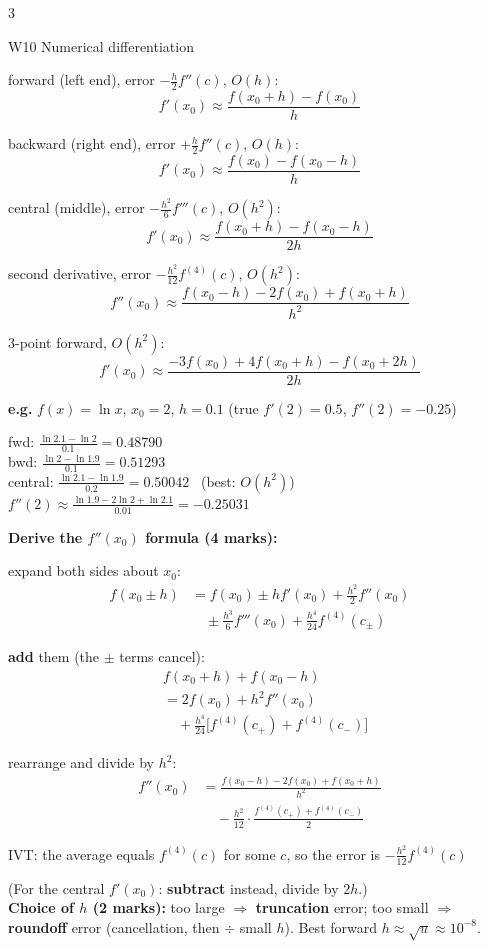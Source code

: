 \documentclass[8pt,a4paper]{extarticle}
\newcommand{\hd}[1]{\par\vspace{3pt}\noindent\colorbox{accent}{\parbox{\dimexpr\linewidth-2\fboxsep}{\color{white}\bfseries\strut #1}}\par\vspace{1pt}}
\newcommand{\sub}[1]{\textbf{\color{accent}#1}}
\newenvironment{ex}[1]{\par\vspace{2pt}\noindent\begin{lrbox}{\exbox}\begin{minipage}{\dimexpr\linewidth-2\fboxsep}\RaggedRight\color{grn}\textbf{e.g.} #1\par\setlength{\parskip}{1.5pt}}{\end{minipage}\end{lrbox}\colorbox{exbg}{\usebox{\exbox}}\par\vspace{1pt}}
\begin{document}
\begin{multicols*}{3}
\hd{W10 Numerical differentiation}
\begin{tl}
\item forward (left end), error $-\frac h2f''(c)$, $O(h)$:
\[f'(x_0)\approx\frac{f(x_0+h)-f(x_0)}{h}\]
\item backward (right end), error $+\frac h2f''(c)$, $O(h)$:
\[f'(x_0)\approx\frac{f(x_0)-f(x_0-h)}{h}\]
\item central (middle), error $-\frac{h^2}{6}f'''(c)$, $O(h^2)$:
\[f'(x_0)\approx\frac{f(x_0+h)-f(x_0-h)}{2h}\]
\item second derivative, error $-\frac{h^2}{12}f^{(4)}(c)$, $O(h^2)$:
\[f''(x_0)\approx\frac{f(x_0-h)-2f(x_0)+f(x_0+h)}{h^2}\]
\item 3-point forward, $O(h^2)$:
\[f'(x_0)\approx\frac{-3f(x_0)+4f(x_0+h)-f(x_0+2h)}{2h}\]
\end{tl}
\begin{ex}{$f(x)=\ln x$, $x_0=2$, $h=0.1$ (true $f'(2)=0.5$, $f''(2)=-0.25$)}
fwd: $\frac{\ln2.1-\ln2}{0.1}=0.48790$\\
bwd: $\frac{\ln2-\ln1.9}{0.1}=0.51293$\\
central: $\frac{\ln2.1-\ln1.9}{0.2}=0.50042$ \ (best: $O(h^2)$)\\
$f''(2)\approx\frac{\ln1.9-2\ln2+\ln2.1}{0.01}=-0.25031$
\end{ex}
\sub{Derive the $f''(x_0)$ formula (4 marks):}
\begin{der}
\item expand both sides about $x_0$:
\begin{align*}f(x_0\pm h)&=f(x_0)\pm hf'(x_0)+\tfrac{h^2}2f''(x_0)\\&\quad\pm\tfrac{h^3}6f'''(x_0)+\tfrac{h^4}{24}f^{(4)}(c_\pm)\end{align*}
\item \textbf{add} them (the $\pm$ terms cancel):
\begin{align*}&f(x_0+h)+f(x_0-h)\\&=2f(x_0)+h^2f''(x_0)\\&\quad+\tfrac{h^4}{24}\big[f^{(4)}(c_+)+f^{(4)}(c_-)\big]\end{align*}
\item rearrange and divide by $h^2$:
\begin{align*}f''(x_0)&=\frac{f(x_0-h)-2f(x_0)+f(x_0+h)}{h^2}\\&\quad-\frac{h^2}{12}\cdot\frac{f^{(4)}(c_+)+f^{(4)}(c_-)}{2}\end{align*}
\item IVT: the average equals $f^{(4)}(c)$ for some $c$, so the error is $-\frac{h^2}{12}f^{(4)}(c)$
\end{der}
(For the central $f'(x_0)$: \textbf{subtract} instead, divide by $2h$.)\\
\sub{Choice of $h$ (2 marks):} too large $\Rightarrow$ \textbf{truncation} error; too small $\Rightarrow$ \textbf{roundoff} error (cancellation, then $\div$ small $h$). Best forward $h\approx\sqrt u\approx10^{-8}$.


\end{multicols*}
\end{document}
